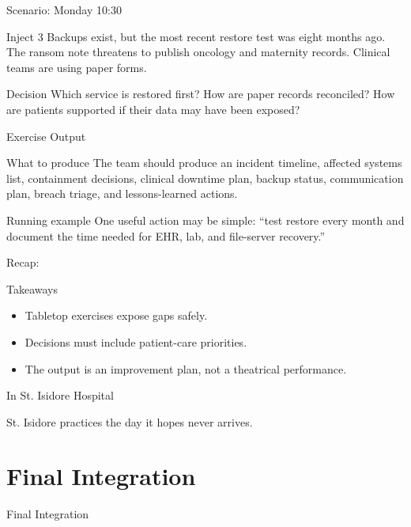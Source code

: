 \documentclass[presentation]{beamer}
\newcommand{\sectiontitleframe}[1]{
\begin{frame}[plain,c]
\begin{center}
{\usebeamerfont{title}\usebeamercolor[fg]{title}#1}
\end{center}
\end{frame}
}
\newcommand{\scenario}{St. Isidore Hospital}
\newcommand{\takeawaysframe}[2]{
\begin{frame}[c]{Recap: \insertsection}
\begin{block}{Takeaways}
#1
\end{block}
\begin{exampleblock}{In \scenario}
#2
\end{exampleblock}
\end{frame}
}
\begin{document}
\begin{frame}[c]{Scenario: Monday 10:30}
\begin{block}{Inject 3}
Backups exist, but the most recent restore test was eight months ago. The ransom note threatens to
publish oncology and maternity records. Clinical teams are using paper forms.
\end{block}

\begin{exampleblock}{Decision}
Which service is restored first? How are paper records reconciled? How are patients supported if
their data may have been exposed?
\end{exampleblock}
\end{frame}

\begin{frame}[c]{Exercise Output}
\begin{block}{What to produce}
The team should produce an incident timeline, affected systems list, containment decisions, clinical
downtime plan, backup status, communication plan, breach triage, and lessons-learned actions.
\end{block}

\begin{exampleblock}{Running example}
One useful action may be simple: ``test restore every month and document the time needed for EHR,
lab, and file-server recovery.''
\end{exampleblock}
\end{frame}

\takeawaysframe{
\begin{itemize}
    \item Tabletop exercises expose gaps safely.
    \item Decisions must include patient-care priorities.
    \item The output is an improvement plan, not a theatrical performance.
\end{itemize}
}{
St. Isidore practices the day it hopes never arrives.
}

\section{Final Integration}
\sectiontitleframe{Final Integration}
\end{document}
